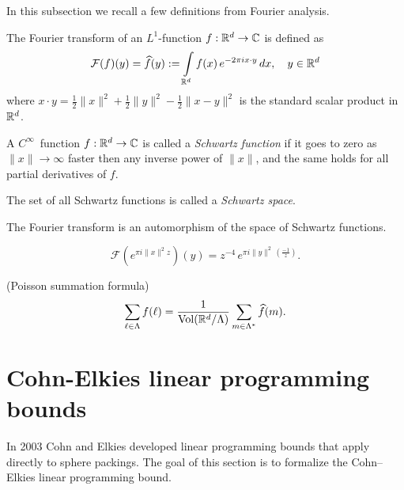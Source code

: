 In this subsection we recall a few definitions from Fourier analysis.
\begin{definition}\label{def-Fourier-Transform} %
The Fourier transform of an $L^1$-function $f:\mathbb{R}^d\to\mathbb{C}$ is defined as
$$\mathcal{F}(f)(y)=\widehat{f}(y):=\int\limits_{\mathbb{R}^d} f(x)\,e^{-2\pi i x\cdot y}\,dx,\quad y\in\mathbb{R}^d $$
where $x\cdot y=\frac12\|x\|^2+\frac12\|y\|^2-\frac12\|x-y\|^2$ is the standard scalar product in $\mathbb{R}^d$.
\end{definition}
\begin{definition}\label{def-Schwartz-Function}
A $C^\infty$~function $f:\mathbb{R}^d\to\mathbb{C}$ is called a \emph{Schwartz function} if it goes to zero as $\|x\|\to\infty$ faster then any inverse power of $\|x\|$, and the same holds for all partial derivatives of $f$.
\end{definition}
\begin{definition}\label{def-Schwartz-Space}
    The set of all Schwartz functions is called a \emph{Schwartz space}.
\end{definition}
\begin{lemma}\label{lemma-Fourier-transform-is-automorphism}
  The Fourier transform is an automorphism of the space of Schwartz functions.
\end{lemma}
\begin{lemma}\label{lemma-Gaussian-Fourier}
\begin{equation}\mathcal{F}(e^{\pi i  \|x\|^2 z})(y)=z^{-4}\,e^{\pi i \|y\|^2 \,(\frac{-1}{z}) }.\end{equation}
\end{lemma}
\begin{theorem}\label{thm-Poisson-summation-formula}
  (Poisson summation formula)$$\sum_{\ell\in\Lambda}f(\ell)=\frac{1}{\mathrm{Vol}(\mathbb{R}^d/\Lambda)}\sum_{m\in\Lambda^*}\widehat{f}(m).$$
\end{theorem}

\section{Cohn-Elkies linear programming bounds}

In 2003 Cohn and Elkies \cite{ElkiesCohn}  developed  linear programming bounds that apply directly to sphere packings. The goal of this section is to formalize the Cohn--Elkies linear programming bound.

